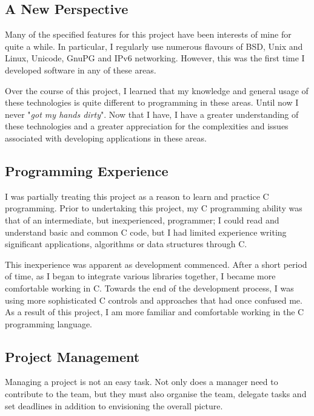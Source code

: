
\subsection{A New Perspective}

Many of the specified features for this project have been interests of
mine for quite a while. In particular, I regularly use numerous flavours
of BSD, Unix and Linux, Unicode, GnuPG and IPv6 networking. However, this 
was the first time I developed software in any of these areas.


Over the course of this project, I learned that my knowledge and general
usage of these technologies is quite different to programming in these
areas. Until now I never "\emph{got my hands dirty}". Now that I have, I
have a greater understanding of these technologies and a greater
appreciation for the complexities and issues associated with developing
applications in these areas.

\subsection{Programming Experience}

I was partially treating this project as a reason to learn and practice
C programming. Prior to undertaking this project, my C programming ability
was that of an intermediate, but inexperienced, programmer; I could read 
and understand basic and common C code, but I had limited experience
writing significant applications, algorithms or data structures through
C.


This inexperience was apparent as development commenced. After a short
period of time, as I began to integrate various libraries together, I
became more comfortable working in C. Towards the end of the
development process, I was using more sophisticated C controls and
approaches that had once confused me. As a result of this project, I am
more familiar and comfortable working in the C programming language.


\subsection{Project Management}


Managing a project is not an easy task. Not only does a manager need to
contribute to the team, but they must also organise the team, delegate
tasks and set deadlines in addition to envisioning the overall picture.


